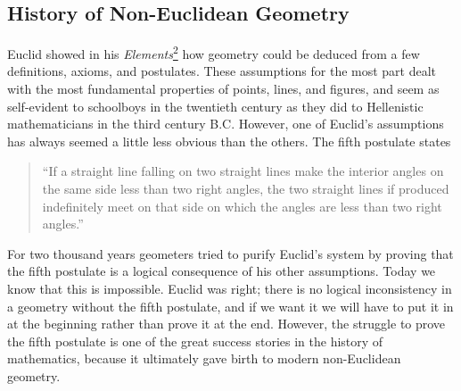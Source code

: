 
\subsection{History of Non-Euclidean Geometry}\label{sec:1.1}

Euclid showed in his \emph{Elements}\hyperref[ch1-ref-2]{\textsuperscript{2}}
how geometry could be deduced from a few definitions, axioms, and postulates.
These assumptions for the most part dealt with the most fundamental properties
of points, lines, and figures, and seem as self-evident to schoolboys in the
twentieth century as they did to Hellenistic mathematicians in the third
century B.C. However, one of Euclid's assumptions has always seemed a little
less obvious than the others. The fifth postulate states

\begin{quote}
``If a straight line falling on two straight lines make the interior angles on
the same side less than two right angles, the two straight lines if produced
indefinitely meet on that side on which the angles are less than two right
angles.''
\end{quote}

For two thousand years geometers tried to purify Euclid's system by proving
that the fifth postulate is a logical consequence of his other assumptions.
Today we know that this is impossible. Euclid was right; there is no logical
inconsistency in a geometry without the fifth postulate, and if we want it we
will have to put it in at the beginning rather than prove it at the end.
However, the struggle to prove the fifth postulate is one of the great success
stories in the history of mathematics, because it ultimately gave birth to
modern non-Euclidean geometry.

